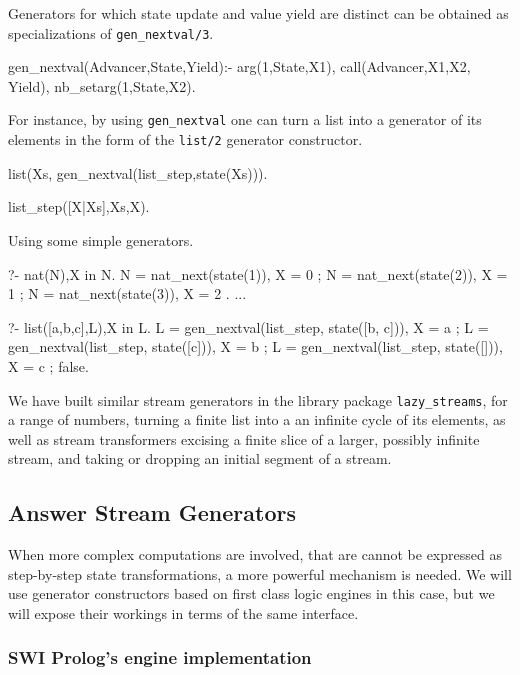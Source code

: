 \documentclass{new_tlp}
\begin{document}
Generators for which state update and value yield are distinct
can be obtained as specializations of {\tt gen\_nextval/3}.
\begin{code}
gen_nextval(Advancer,State,Yield):-
  arg(1,State,X1),
  call(Advancer,X1,X2, Yield),
  nb_setarg(1,State,X2).
\end{code}

For instance, by using {\tt gen\_nextval} one can turn a list into a generator of its elements  in the form of the {\tt list/2} generator constructor.
\begin{code}
list(Xs, gen_nextval(list_step,state(Xs))).

list_step([X|Xs],Xs,X).
\end{code}

\BX
Using some simple generators.
\begin{codex}
?- nat(N),X in N.
N = nat_next(state(1)), X = 0 ;
N = nat_next(state(2)), X = 1 ;
N = nat_next(state(3)), X = 2 .
...

?- list([a,b,c],L),X in L.
L = gen_nextval(list_step, state([b, c])), X = a ;
L = gen_nextval(list_step, state([c])), X = b ;
L = gen_nextval(list_step, state([])), X = c ;
false.
\end{codex}
\EX

We have built similar stream generators in the library package 
{\tt lazy\_streams}, for a range of numbers, turning a finite list into
a an infinite cycle of its elements, as well as stream 
transformers excising a finite slice of a larger, possibly infinite stream,
and taking or dropping an initial segment of a stream.

\subsection{Answer Stream Generators}

When more complex computations are involved, that are cannot be expressed as step-by-step state transformations, a more powerful mechanism is needed. We will use generator constructors based on first class logic engines in this case, but we will expose their workings in terms of the same interface.

\subsubsection{SWI Prolog's engine implementation}
\end{document}
